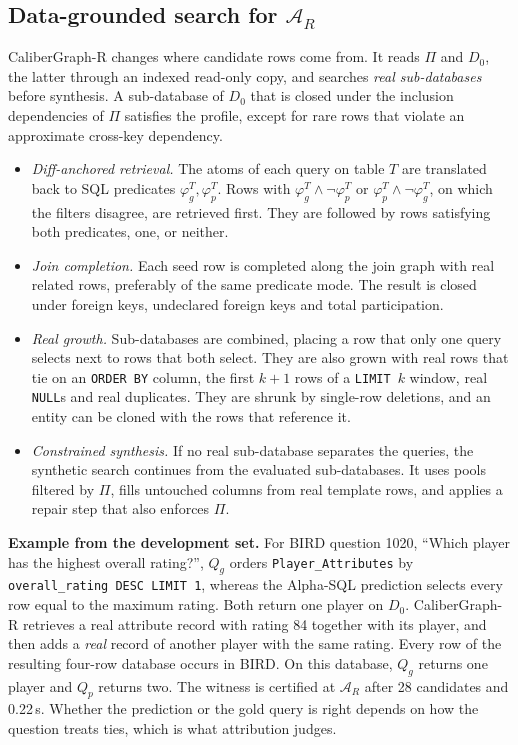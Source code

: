 \subsection{Data-grounded search for $\mathcal A_R$}\label{sec:realsearch}
CaliberGraph-R changes where candidate rows come from. It reads $\Pi$ and $D_0$, the latter through an indexed read-only copy, and searches \emph{real sub-databases} before synthesis. A sub-database of $D_0$ that is closed under the inclusion dependencies of $\Pi$ satisfies the profile, except for rare rows that violate an approximate cross-key dependency.
\begin{itemize}
\item \emph{Diff-anchored retrieval.} The atoms of each query on table $T$ are translated back to SQL predicates $\varphi_g^T,\varphi_p^T$. Rows with $\varphi_g^T\wedge\neg\varphi_p^T$ or $\varphi_p^T\wedge\neg\varphi_g^T$, on which the filters disagree, are retrieved first. They are followed by rows satisfying both predicates, one, or neither.
\item \emph{Join completion.} Each seed row is completed along the join graph with real related rows, preferably of the same predicate mode. The result is closed under foreign keys, undeclared foreign keys and total participation.
\item \emph{Real growth.} Sub-databases are combined, placing a row that only one query selects next to rows that both select. They are also grown with real rows that tie on an \texttt{ORDER BY} column, the first $k{+}1$ rows of a \texttt{LIMIT}~$k$ window, real \texttt{NULL}s and real duplicates. They are shrunk by single-row deletions, and an entity can be cloned with the rows that reference it.
\item \emph{Constrained synthesis.} If no real sub-database separates the queries, the synthetic search continues from the evaluated sub-databases. It uses pools filtered by $\Pi$, fills untouched columns from real template rows, and applies a repair step that also enforces $\Pi$.
\end{itemize}

\textbf{Example from the development set.} For BIRD question 1020, ``Which player has the highest overall rating?'', $Q_g$ orders \texttt{Player\_Attributes} by \texttt{overall\_rating DESC LIMIT 1}, whereas the Alpha-SQL prediction selects every row equal to the maximum rating. Both return one player on $D_0$. CaliberGraph-R retrieves a real attribute record with rating 84 together with its player, and then adds a \emph{real} record of another player with the same rating. Every row of the resulting four-row database occurs in BIRD. On this database, $Q_g$ returns one player and $Q_p$ returns two. The witness is certified at $\mathcal A_R$ after 28 candidates and 0.22\,s. Whether the prediction or the gold query is right depends on how the question treats ties, which is what attribution judges.
